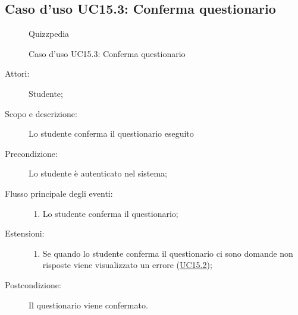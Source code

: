 \subsection{Caso d'uso UC15.3: Conferma questionario}
        \begin{figure}[H]
            \centering
            \begin{resizedtikzpicture}{\textwidth}
		\begin{umlsystem}[x=0, fill=lightgray!20]{Quizzpedia}
		\end{umlsystem}
            \end{resizedtikzpicture}
            \caption{Caso d'uso UC15.3: Conferma questionario}
            \label{fig:UC15.3} 
        \end{figure}
    \begin{description}
\item[Attori:] Studente;
\item[Scopo e descrizione:] Lo studente conferma il questionario eseguito
      \item[Precondizione:] Lo studente è autenticato nel sistema;

        \item[Flusso principale degli eventi:] \begin{enumerate}
          \item Lo studente conferma il questionario;

      \end{enumerate}
    \item[Estensioni:]
      \begin{enumerate}
          \item Se quando lo studente conferma il questionario ci sono domande non risposte viene visualizzato un errore (\hyperlink{UC15.2}{UC15.2});

      \end{enumerate}
    \item[Postcondizione:] Il questionario viene confermato.
  \end{description}
\hypertarget{UC15.4}{}
